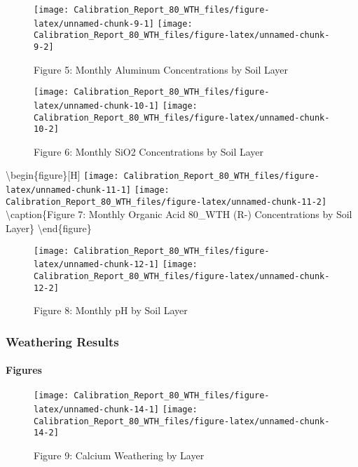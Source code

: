 \documentclass[
]{article}
\begin{document}
\begin{figure}[H]
\texttt{[image: Calibration\_Report\_80\_WTH\_files/figure-latex/unnamed-chunk-9-1]} \texttt{[image: Calibration\_Report\_80\_WTH\_files/figure-latex/unnamed-chunk-9-2]} \caption{Figure 5: Monthly Aluminum Concentrations by Soil Layer}\label{fig:unnamed-chunk-9}
\end{figure}

\begin{figure}[H]
\texttt{[image: Calibration\_Report\_80\_WTH\_files/figure-latex/unnamed-chunk-10-1]} \texttt{[image: Calibration\_Report\_80\_WTH\_files/figure-latex/unnamed-chunk-10-2]} \caption{Figure 6: Monthly SiO2 Concentrations by Soil Layer}\label{fig:unnamed-chunk-10}
\end{figure}

\textbackslash begin\{figure\}{[}H{]}
\texttt{[image: Calibration\_Report\_80\_WTH\_files/figure-latex/unnamed-chunk-11-1]}
\texttt{[image: Calibration\_Report\_80\_WTH\_files/figure-latex/unnamed-chunk-11-2]}
\textbackslash caption\{Figure 7: Monthly Organic Acid 80\_WTH (R-)
Concentrations by Soil Layer\}\label{fig:unnamed-chunk-11}
\textbackslash end\{figure\}

\begin{figure}[H]
\texttt{[image: Calibration\_Report\_80\_WTH\_files/figure-latex/unnamed-chunk-12-1]} \texttt{[image: Calibration\_Report\_80\_WTH\_files/figure-latex/unnamed-chunk-12-2]} \caption{Figure 8: Monthly pH by Soil Layer}\label{fig:unnamed-chunk-12}
\end{figure}

\hypertarget{weathering-results}{%
\subsubsection{Weathering Results}\label{weathering-results}}

\hypertarget{figures}{%
\paragraph{Figures}\label{figures}}

\begin{figure}[H]
\texttt{[image: Calibration\_Report\_80\_WTH\_files/figure-latex/unnamed-chunk-14-1]} \texttt{[image: Calibration\_Report\_80\_WTH\_files/figure-latex/unnamed-chunk-14-2]} \caption{Figure 9: Calcium Weathering by Layer}\label{fig:unnamed-chunk-14}
\end{figure}
\end{document}

